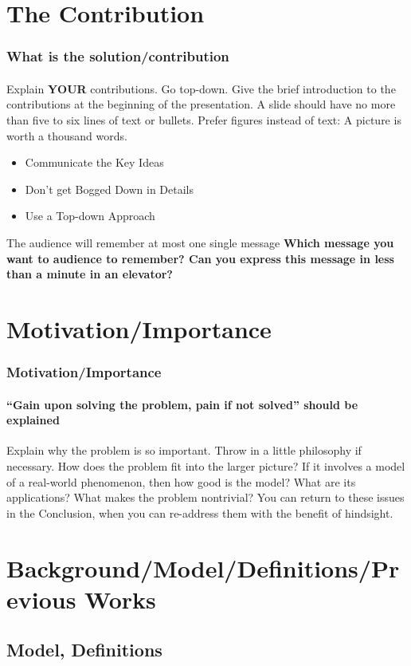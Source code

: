 \documentclass[11pt]{beamer}              %
\begin{document}
\section{The Contribution}
\begin{frame}
\frametitle{What is the solution/contribution}
\framesubtitle{}
Explain \textbf{YOUR} contributions. Go top-down. Give the brief introduction to the contributions at the beginning of the presentation. A slide should have no more than five to six lines of text or bullets. Prefer figures instead of text: A picture is worth a thousand words.
\begin{itemize}
\item Communicate the Key Ideas
\item Don’t get Bogged Down in Details
\item Use a Top-down Approach
\end{itemize}

The audience will remember at most one single message \textbf{Which message you want to audience to remember? Can you express this message in less than a minute in an elevator?}

\end{frame}


\section{Motivation/Importance}
\begin{frame}
\frametitle{Motivation/Importance}
\framesubtitle{``Gain upon solving the problem, pain if not solved'' should be explained}
Explain why the problem is so important. Throw in a little philosophy if necessary. How does the problem fit into the larger picture? If it involves a model of a real-world phenomenon, then how good is the model? What are its applications? What makes the problem nontrivial? You can return to these issues in the Conclusion, when you can re-address them with the benefit of hindsight.
\end{frame}

\section{Background/Model/Definitions/Previous Works}


\subsection{Model, Definitions}
\end{document}
